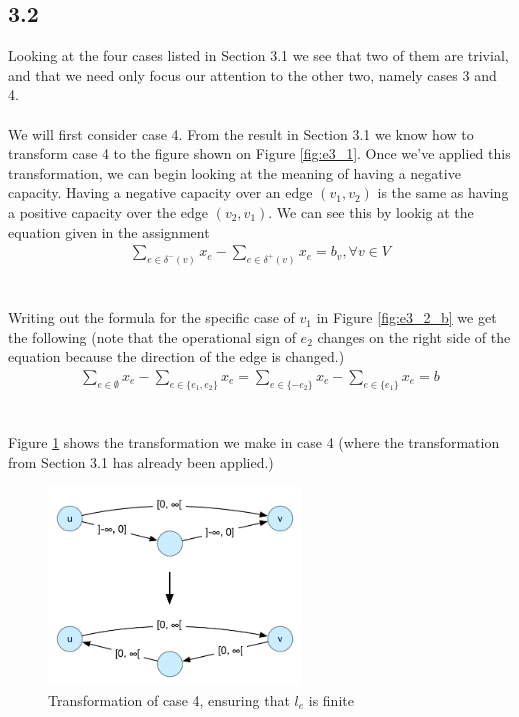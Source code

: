 \documentclass[12pt]{article}
\begin{document}
\subsection{3.2}
Looking at the four cases listed in Section 3.1 we see that two of them are trivial, and that we need only focus our attention to the other two, namely cases 3 and 4.\\
\\
We will first consider case 4. From the result in Section 3.1 we know how to transform case 4 to the figure shown on Figure \ref{fig:e3_1}. Once we've applied this transformation, we can begin looking at the meaning of having a negative capacity. Having a negative capacity over an edge $(v_1, v_2)$ is the same as having a positive capacity over the edge $(v_2, v_1)$. We can see this by lookig at the equation given in the assignment
\begin{align*}
    \sum_{e\in \delta^-(v)}{x_e}-\sum_{e\in \delta^+(v)}{x_e} = b_v, \forall{v} \in V
\end{align*}~\\
\\
Writing out the formula for the specific case of $v_1$ in Figure \ref{fig:e3_2_b} we get the following (note that the operational sign of $e_2$ changes on the right side of the equation because the direction of the edge is changed.)
\begin{align*}
    \sum_{e\in \emptyset}{x_e} - \sum_{e\in \{e_1, e_2\}}{x_e} =
    \sum_{e\in \{-e_2\}}{x_e} - \sum_{e\in \{e_1\}}{x_e} = b
\end{align*}~\\
\\
Figure \ref{fig:e3_2} shows the transformation we make in case 4 (where the transformation from Section 3.1 has already been applied.)

\begin{figure}[h]
  \centering
    \includegraphics[width=0.6\textwidth]{figures/e3_2}
  \caption{Transformation of case 4, ensuring that $l_e$ is finite}
  \label{fig:e3_2}
\end{figure}
\end{document}
